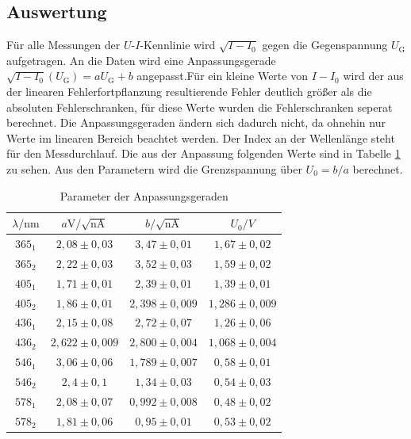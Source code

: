 \subsection{Auswertung}
Für alle Messungen der $U$-$I$-Kennlinie wird $\sqrt{I-I_0}$ gegen die Gegenspannung $U_\mathrm{G}$ aufgetragen. An die Daten wird eine Anpassungsgerade $\sqrt{I-I_0}(U_\mathrm{G})=aU_\mathrm{G}+b$ angepasst.Für ein kleine Werte von $I-I_0$ wird der aus der linearen Fehlerfortpflanzung resultierende Fehler deutlich größer als die absoluten Fehlerschranken, für diese Werte wurden die Fehlerschranken seperat berechnet. Die Anpassungsgeraden ändern sich dadurch nicht, da ohnehin nur Werte im linearen Bereich beachtet werden. Der Index an der Wellenlänge steht für den Messdurchlauf. Die aus der Anpassung folgenden Werte sind in Tabelle \ref{tab:photoeffekt} zu sehen. Aus den Parametern wird die Grenzspannung über $U_0=b/a$ berechnet.

\begin{table}[h]
  \centering
    \begin{tabular}{c c c c}
      \toprule
      $\lambda/\mathrm{nm}$ & $a\mathrm{V}/ \sqrt{\mathrm{nA}}$ & $b/\sqrt{\mathrm{nA}}$ & $U_0/V$\\
      \midrule
      $365_1$ & $2,08 \pm 0,03 $ &$3,47 \pm 0,01 $ & $1,67 \pm 0,02$\\
      $365_2$ & $2,22 \pm 0,03 $ &$3,52 \pm 0,03  $ & $1,59 \pm 0,02$\\
      $405_1$ & $1,71 \pm 0,01 $ &$2,39 \pm 0,01 $ & $1,39 \pm 0,01$\\
      $405_2$ & $1,86 \pm 0,01 $ &$2,398 \pm 0,009$ & $1,286 \pm 0,009$\\
      $436_1$ & $2,15 \pm 0,08 $ &$2,72 \pm 0,07  $ & $1,26 \pm 0,06  $\\
      $436_2$ & $2,622 \pm 0,009$ &$2,800 \pm 0,004$ & $1,068 \pm 0,004 $\\
      $546_1$ & $3,06 \pm 0,06 $ &$1,789 \pm 0,007$ & $0,58 \pm 0,01$\\
      $546_2$ & $2,4 \pm 0,1  $ &$1,34 \pm 0,03  $ & $0,54 \pm 0,03$\\
      $578_1$ & $2,08 \pm 0,07 $ &$0,992 \pm 0,008$ & $0,48 \pm 0,02$\\
      $578_2$ & $1,81 \pm 0,06 $ &$0,95 \pm 0,01$ & $0,53 \pm 0,02$\\
      \bottomrule
    \end{tabular}
    \caption{Parameter der Anpassungsgeraden}
    \label{tab:photoeffekt}
\end{table}


